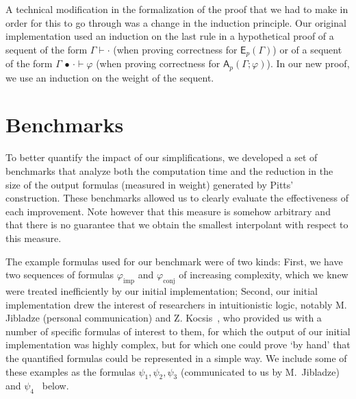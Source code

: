\documentclass[english,review]{jflart}
\theoremstyle{definition}
\theoremstyle{plain}
\newcommand{\Ap}[1]{\mathsf{A}_{p}(#1)}
\newcommand{\Ep}[1]{\mathsf{E}_{p}(#1)}
\renewcommand{\phi}{\varphi}
\newcommand{\cons}{\,\bullet\,}
\begin{document}
A technical modification in the formalization of the proof that we had to make in order for this to go through was a change in the induction principle. Our original implementation used an induction on the last rule in a hypothetical proof of a sequent of the form $\Gamma \vdash \cdot$ (when proving correctness for $\Ep{\Gamma}$) or of a sequent of the form $\Gamma \cons \cdot \vdash \phi$ (when proving correctness for $\Ap{\Gamma; \phi}$). In our new proof, we use an induction on the weight of the sequent.






\section{Benchmarks}\label{sec:benchmarks}
To better quantify the impact of our simplifications, we developed a set of benchmarks that analyze both the computation time and the reduction 
in the size of the output formulas (measured in weight) generated by Pitts' construction. These benchmarks allowed us to clearly evaluate the 
effectiveness of each improvement.
Note however that this measure is somehow arbitrary and that there is no guarantee that we obtain the smallest interpolant with
respect to this measure.

The example formulas used for our benchmark were of two kinds: First, we have two sequences of formulas $\phi_{\text{imp}}$ and $\phi_{\text{conj}}$ of increasing complexity, which we knew were treated inefficiently by our initial implementation; Second, our initial implementation drew the interest of researchers in intuitionistic logic, notably M. Jibladze (personal communication) and Z. Kocsis~\cite{Koc2023}, who provided us with a number of specific formulas of interest to them, for which the output of our initial implementation was highly complex, but for which one could prove `by hand' that the quantified formulas could be represented in a simple way. We include some of these examples as the formulas $\psi_1, \psi_2, \psi_3$ (communicated to us by M.~Jibladze) and $\psi_4$~\cite[3.13]{Koc2023} below.
\end{document}
